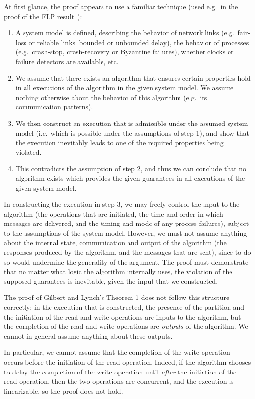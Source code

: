 \documentclass[a4paper,twocolumn,10pt]{article}
\begin{document}
At first glance, the proof appears to use a familiar technique (used e.g.\ in the proof of the FLP
result~\cite{Fischer1985tt}):
\begin{enumerate}
\item A system model is defined, describing the behavior of network links (e.g.\ fair-loss or
    reliable links, bounded or unbounded delay), the behavior of processes (e.g.\ crash-stop,
    crash-recovery or Byzantine failures), whether clocks or failure detectors are available, etc.
\item We assume that there exists an algorithm that ensures certain properties hold in all
    executions of the algorithm in the given system model. We assume nothing otherwise about the
    behavior of this algorithm (e.g.\ its communication patterns).
\item We then construct an execution that is admissible under the assumed system model (i.e.\ which
    is possible under the assumptions of step 1), and show that the execution inevitably leads to
    one of the required properties being violated.
\item This contradicts the assumption of step 2, and thus we can conclude that no algorithm exists
    which provides the given guarantees in all executions of the given system model.
\end{enumerate}

In constructing the execution in step 3, we may freely control the input to the algorithm (the
operations that are initiated, the time and order in which messages are delivered, and the timing
and mode of any process failures), subject to the assumptions of the system model. However, we must
not assume anything about the internal state, communication and output of the algorithm (the
responses produced by the algorithm, and the messages that are sent), since to do so would undermine
the generality of the argument. The proof must demonstrate that no matter what logic the algorithm
internally uses, the violation of the supposed guarantees is inevitable, given the input that we
constructed.

The proof of Gilbert and Lynch's Theorem 1 does not follow this structure correctly: in the
execution that is constructed, the presence of the partition and the initiation of the read and
write operations are inputs to the algorithm, but the completion of the read and write operations
are \emph{outputs} of the algorithm. We cannot in general assume anything about these outputs.

In particular, we cannot assume that the completion of the write operation occurs before the
initiation of the read operation. Indeed, if the algorithm chooses to delay the completion of the
write operation until \emph{after} the initiation of the read operation, then the two operations are
concurrent, and the execution is linearizable, so the proof does not hold.
\end{document}
